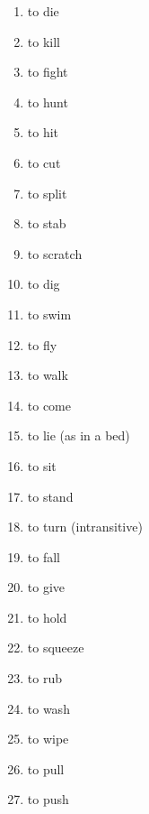 \begin{enumerate}
\item   to die 

\item   to kill 

\item   to fight 

\item   to hunt 

\item   to hit 

\item   to cut 

\item   to split 

\item   to stab 

\item   to scratch 

\item   to dig 

\item   to swim 

\item   to fly 

\item   to walk 

\item   to come 

\item   to lie (as in a bed) 

\item   to sit 

\item   to stand 

\item   to turn (intransitive) 

\item   to fall 

\item   to give 

\item   to hold 

\item   to squeeze 

\item   to rub 

\item   to wash 

\item   to wipe 

\item   to pull 

\item   to push 


\end{enumerate}
